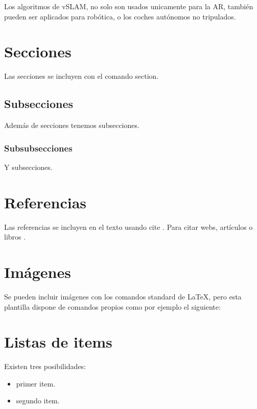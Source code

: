 	Los algoritmos de vSLAM, no solo son usados unicamente para la AR, también pueden ser aplicados para robótica, o los coches autónomos no tripulados.
	
	
\section{Secciones}

Las secciones se incluyen con el comando section.

\subsection{Subsecciones}

Además de secciones tenemos subsecciones.

\subsubsection{Subsubsecciones}

Y subsecciones. 


\section{Referencias}

Las referencias se incluyen en el texto usando cite \cite{wiki:latex}. Para citar webs, artículos o libros \cite{koza92}.


\section{Imágenes}

Se pueden incluir imágenes con los comandos standard de \LaTeX, pero esta plantilla dispone de comandos propios como por ejemplo el siguiente:




\section{Listas de items}

Existen tres posibilidades:

\begin{itemize}
	\item primer item.
	\item segundo item.
\end{itemize}


